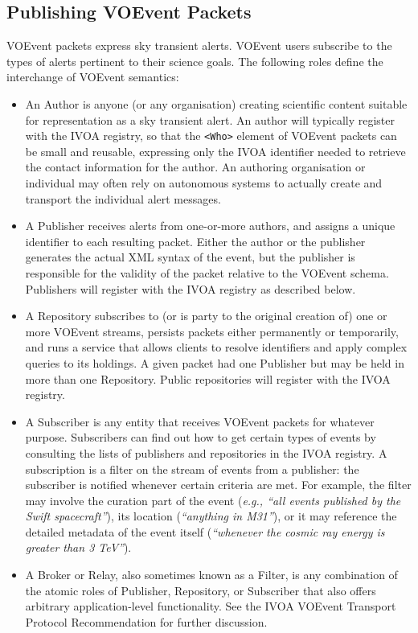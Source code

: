 \documentclass[11pt,a4paper]{ivoa}
\begin{document}
\subsection{Publishing VOEvent Packets}
\label{sec:2.1}
VOEvent packets express sky transient alerts. VOEvent users subscribe to the
types of alerts pertinent to their science goals. The following roles define the
interchange of VOEvent semantics:
\begin{itemize}
\item An Author is anyone (or any organisation) creating scientific
content suitable for representation as a sky transient alert. An author will
typically register with the IVOA registry, so that the \verb|<Who>| element of
VOEvent packets can be small and reusable, expressing only the IVOA identifier
needed to retrieve the contact information for the author. An authoring
organisation or individual may often rely on autonomous systems to actually
create and transport the individual alert messages.
\item A Publisher receives alerts from one-or-more authors, and
assigns a unique identifier to each resulting packet. Either the author or the
publisher generates the actual XML syntax of the event, but the publisher is
responsible for the validity of the packet relative to the VOEvent schema.
Publishers will register with the IVOA registry as described below.
\item A Repository subscribes to (or is party to the original
creation of) one or more VOEvent streams, persists packets either permanently
or temporarily, and runs a service that allows clients to resolve identifiers
and apply complex queries to its holdings. A given packet had one Publisher but
may be held in more than one Repository. Public repositories will register with
the IVOA registry.
\item A Subscriber is any entity that receives VOEvent packets for
whatever purpose. Subscribers can find out how to get certain types of events
by consulting the lists of publishers and repositories in the IVOA registry.
A subscription is a filter on the stream of events from a publisher: the
subscriber is notified whenever certain criteria are met. For example, the
filter may involve the curation part of the event (\emph{e.g., ``all events
published by the Swift spacecraft''}), its location (\emph{``anything in
M31''}), or it may reference the detailed metadata of the event itself
(\emph{``whenever the cosmic ray energy is greater than 3 TeV''}).
\item A Broker or Relay, also sometimes known as a Filter, is any combination
of the atomic roles of Publisher, Repository, or Subscriber that also offers
arbitrary application-level functionality. See the IVOA VOEvent Transport Protocol
Recommendation \citep{2017ivoa.spec.0320S} for further discussion.
\end{itemize}
\end{document}
